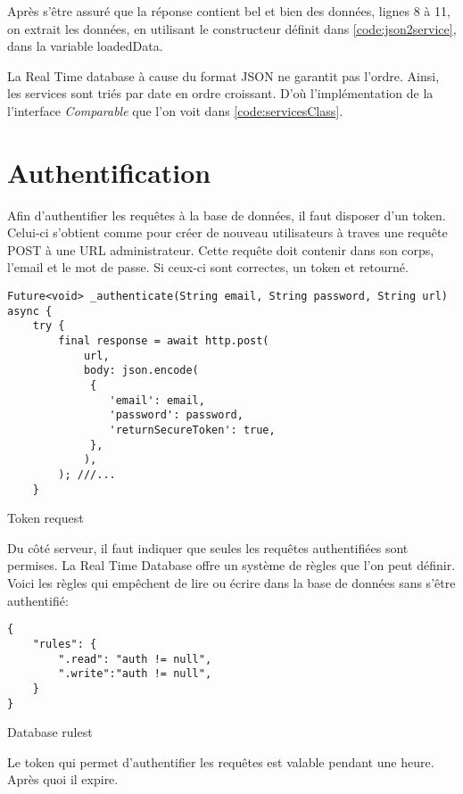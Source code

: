 Après s'être assuré que la réponse contient bel et bien des données, lignes 8 à 11, on extrait les données, en utilisant le constructeur définit dans \ref{code:json2service}, dans la variable loadedData. 

La Real Time database à cause du format JSON ne garantit pas l'ordre. Ainsi, les services sont triés par date en ordre croissant. D'où l'implémentation de la l'interface \textit{Comparable} que l'on voit dans \ref{code:servicesClass}.


\newpage
\section{Authentification}
Afin d'authentifier les requêtes à la base de données, il faut disposer d'un token. Celui-ci s'obtient comme pour créer de nouveau utilisateurs à traves une requête POST à une URL administrateur. Cette requête doit contenir dans son corps, l'email et le mot de passe. Si ceux-ci sont correctes, un token et retourné. 
\begin{listing}[!h]
    \begin{verbatim}
Future<void> _authenticate(String email, String password, String url) async {
    try {
        final response = await http.post(
            url,
            body: json.encode(
             {
                'email': email,
                'password': password,
                'returnSecureToken': true,
             },
            ),
        ); ///...
    }
    \end{verbatim}
    \caption{Token request}
    \label{code:authenticate}
    \end{listing}
Du côté serveur, il faut indiquer que seules les requêtes authentifiées sont permises. La Real Time Database offre un système de règles que l'on peut définir. Voici les règles qui empêchent de lire ou écrire dans la base de données sans s'être authentifié:

\begin{listing}[!h]
    \begin{verbatim}
{
    "rules": {
        ".read": "auth != null",
        ".write":"auth != null",
    }
}
    \end{verbatim}
    \caption{Database rulest}
    \label{code:rules}
    \end{listing}

Le token qui permet d'authentifier les requêtes est valable pendant une heure. Après quoi il expire.
